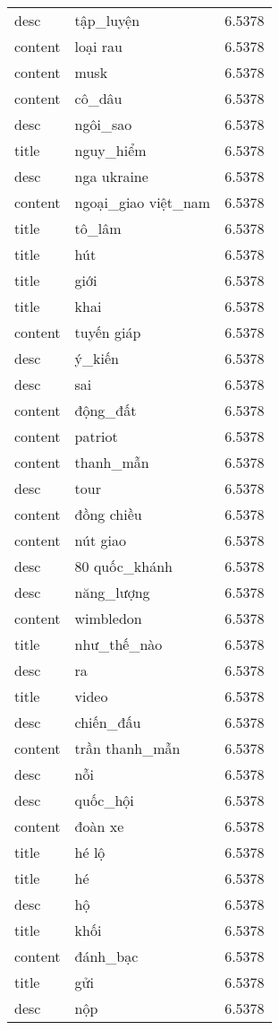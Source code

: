 \documentclass{article}
\begin{document}
\begin{tabular}{lll}
desc & tập\_luyện & 6.5378\\
content & loại rau & 6.5378\\
content & musk & 6.5378\\
content & cô\_dâu & 6.5378\\
desc & ngôi\_sao & 6.5378\\
title & nguy\_hiểm & 6.5378\\
desc & nga ukraine & 6.5378\\
content & ngoại\_giao việt\_nam & 6.5378\\
title & tô\_lâm & 6.5378\\
title & hút & 6.5378\\
title & giới & 6.5378\\
title & khai & 6.5378\\
content & tuyến giáp & 6.5378\\
desc & ý\_kiến & 6.5378\\
desc & sai & 6.5378\\
content & động\_đất & 6.5378\\
content & patriot & 6.5378\\
content & thanh\_mẫn & 6.5378\\
desc & tour & 6.5378\\
content & đồng chiều & 6.5378\\
content & nút giao & 6.5378\\
desc & 80 quốc\_khánh & 6.5378\\
desc & năng\_lượng & 6.5378\\
content & wimbledon & 6.5378\\
title & như\_thế\_nào & 6.5378\\
desc & ra & 6.5378\\
title & video & 6.5378\\
desc & chiến\_đấu & 6.5378\\
content & trần thanh\_mẫn & 6.5378\\
desc & nỗi & 6.5378\\
desc & quốc\_hội & 6.5378\\
content & đoàn xe & 6.5378\\
title & hé lộ & 6.5378\\
title & hé & 6.5378\\
desc & hộ & 6.5378\\
title & khối & 6.5378\\
content & đánh\_bạc & 6.5378\\
title & gửi & 6.5378\\
desc & nộp & 6.5378\\

\end{tabular}
\end{document}
